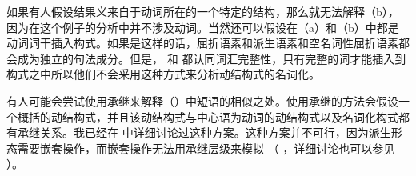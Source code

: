 %
    如果有人假设结果义来自于动词所在的一个特定的结构，那么就无法解释（b），因为在这个例子的分析中并不涉及动词。当然还可以假设在（a）和（b）中都是动词词干插入构式。如果是这样的话，屈折语素和派生语素和空名词性屈折语素都会成为独立的句法成分。但是， \citet[]{Goldberg2003a}和 \citet{ADT2013a}都认同词汇完整性，只有完整的词才能插入到构式之中所以他们不会采用这种方式来分析动结构式的名词化。

    有人可能会尝试使用承继来解释（）中短语的相似之处。使用承继的方法会假设一个概括的动结构式，并且该动结构式与中心语为动词的动结构式以及名词化构式都有承继关系。我已经在 中详细讨论过这种方案。这种方案并不可行，因为派生形态需要嵌套操作，而嵌套操作无法用承继层级来模拟 （ ，详细讨论也可以参见 ）。

